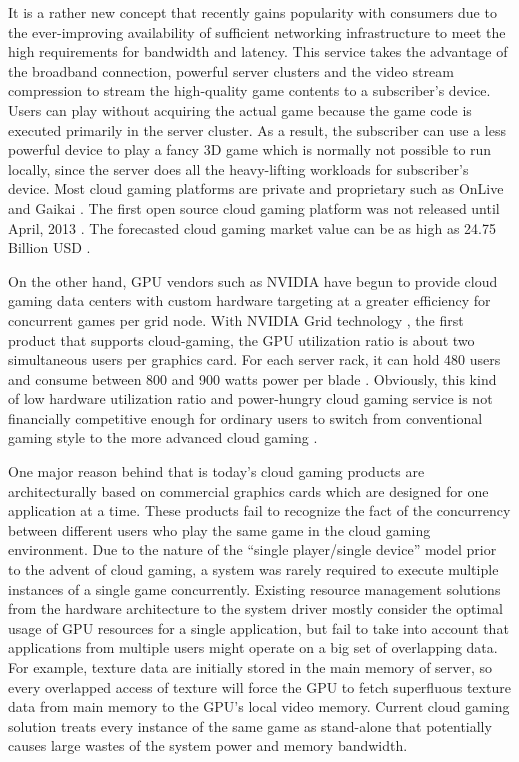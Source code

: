 \documentclass[pageno]{jpaper}
\begin{document}
It is a rather new concept that recently gains popularity with consumers due to the ever-improving availability of sufficient networking infrastructure to meet the high requirements for bandwidth and latency. This service takes the advantage of the broadband connection, powerful server clusters and the video stream compression to stream the high-quality game contents to a subscriber's device. Users can play without acquiring the actual game because the game code is executed primarily in the server cluster. As a result, the subscriber can use a less powerful device to play a fancy 3D game which is normally not possible to run locally, since the server does all the heavy-lifting workloads for subscriber's device. Most cloud gaming platforms are private and proprietary such as OnLive and Gaikai \cite{OnLive}\cite{Gaikai}. The first open source cloud gaming platform was not released until April, 2013 \cite{GamingAnywhere}. The forecasted cloud gaming market value can be as high as 24.75 Billion USD \cite{marketShare}.


On the other hand, GPU vendors such as NVIDIA have begun to provide cloud gaming data centers with custom hardware targeting at a greater efficiency for concurrent games per grid node. With NVIDIA Grid technology \cite{nvgrid}, the first product that supports cloud-gaming, the GPU utilization ratio is about two simultaneous users per graphics card. For each server rack, it can hold 480 users and consume between 800 and 900 watts power per blade \cite{gridNews}. Obviously, this kind of low hardware utilization ratio and power-hungry cloud gaming service is not financially competitive enough for ordinary users to switch from conventional gaming style to the more advanced cloud gaming \cite{radeonsky}\cite{gridNews}.


 One major reason behind that is today's cloud gaming products are architecturally based on commercial graphics cards which are designed for one application at a time. These products fail to recognize the fact of the concurrency between different users who play the same game in the cloud gaming environment. Due to the nature of the ``single player/single device'' model prior to the advent of cloud gaming, a system was rarely required to execute multiple instances of a single game concurrently. Existing resource management solutions from the hardware architecture to the system driver mostly consider the optimal usage of GPU resources for a single application, but fail to take into account that applications from multiple users might operate on a big set of overlapping data. For example, texture data are initially stored in the main memory of server, so every overlapped access of texture will force the GPU to fetch superfluous texture data from main memory to the GPU's local video memory. Current cloud gaming solution treats every instance of the same game as stand-alone that potentially causes large wastes of the system power and memory bandwidth.
\end{document}
